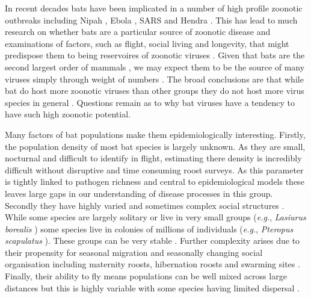 In recent decades bats have been implicated in a number of high profile zoonotic outbreaks including Nipah \cite{field2001natural, halpin2011pteropid}, Ebola \cite{leroy2005fruit}, SARS \cite{li2005bats} and Hendra \cite{field2001natural}.
This has lead to much research on whether bats are a particular source of zoonotic disease \cite{luis2013comparison, olival2015bats, wang2011mass} and examinations of factors, such as flight, social living and longevity, that might predispose them to being reservoires of zoonotic viruses \cite{calisher2006bats, o2014bat, dobson2005links, racey2015uniqueness, kuzmin2011bats}.
Given that bats are the second largest order of mammals \cite{wilson2005mammal}, we may expect them to be the source of many viruses simply through weight of numbers \cite{luis2013comparison}.
The broad conclusions are that while bat do host more zoonotic viruses than other groups \cite{luis2013comparison} they do not host more virus species in general \cite{olival2015bats}.
Questions remain as to why bat viruses have a tendency to have such high zoonotic potential.

Many factors of bat populations make them epidemiologically interesting.
Firstly, the population density of most bat species is largely unknown.
As they are small, nocturnal and difficult to identify in flight, estimating there density is incredibly difficult without disruptive and time consuming roost surveys.
As this parameter is tightly linked to pathogen richness \cite{kamiya2014determines} and central to epidemiological models \cite{may1979population, anderson1979population} these leaves large gaps in our understanding of disease processes in this group.
Secondly they have highly varied and sometimes complex social structures \cite{kerth2008causes}.
While some species are largely solitary or live in very small groups (\emph{e.g.}, \emph{Lasiurus borealis} \cite{shump1982lasiurus}) some species live in colonies of millions of individuals (\emph{e.g.}, \emph{Pteropus scapulatus} \cite{birt2008little}).
These groups can be very stable \cite{kerth2011bats, mccracken1981social}.
Further complexity arises due to their propensity for seasonal migration \cite{fleming2003ecology, richter2008first, cryan2014continental} and seasonally changing social organisation including maternity roosts, hibernation roosts and swarming sites \cite{kerth2008causes}.
Finally, their ability to fly means populations can be well mixed across large distances \cite{peel2013continent, petit1999male} but this is highly variable with some species having limited dispersal \cite{wilmer1994extreme}.






